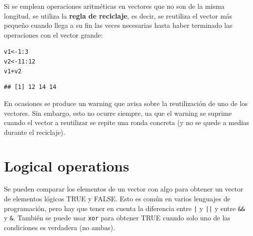 \documentclass{config/apuntes}\usepackage[]{graphicx}\usepackage[]{xcolor}
\makeatletter
\newcommand{\hlnum}[1]{\textcolor[rgb]{0.686,0.059,0.569}{#1}}%
\newcommand{\hlopt}[1]{\textcolor[rgb]{0,0,0}{#1}}%
\newcommand{\hldef}[1]{\textcolor[rgb]{0.345,0.345,0.345}{#1}}%
\newcommand{\hlkwb}[1]{\textcolor[rgb]{0.69,0.353,0.396}{#1}}%
\newenvironment{kframe}{%
 \def\at@end@of@kframe{}%
 \ifinner\ifhmode%
  \def\at@end@of@kframe{\end{minipage}}%
  \begin{minipage}{\columnwidth}%
 \fi\fi%
 \def\FrameCommand##1{\hskip\@totalleftmargin \hskip-\fboxsep
 \colorbox{shadecolor}{##1}\hskip-\fboxsep
     \hskip-\linewidth \hskip-\@totalleftmargin \hskip\columnwidth}%
 \MakeFramed {\advance\hsize-\width
   \@totalleftmargin\z@ \linewidth\hsize
   \@setminipage}}%
 {\par\unskip\endMakeFramed%
 \at@end@of@kframe}
\newenvironment{knitrout}{}{} %
\newcommand{\code}[1]{\texttt{#1}}
\makeatother
\begin{document}
Si se emplean operaciones aritméticas en vectores que no son de la misma longitud, se utiliza la \textbf{regla de reciclaje}, es decir, se reutiliza el vector más pequeño cuando llega a su fin las veces necesarias hasta haber terminado las operaciones con el vector grande:

\begin{knitrout}
\color{fgcolor}\begin{kframe}
\begin{alltt}
\hldef{v1} \hlkwb{<-} \hlnum{1}\hlopt{:}\hlnum{3}
\hldef{v2} \hlkwb{<-} \hlnum{11}\hlopt{:}\hlnum{12}
\hldef{v1} \hlopt{+} \hldef{v2}
\end{alltt}


{\ttfamily\noindent\color{warningcolor}{\#\# Warning in v1 + v2: longitud de objeto mayor no es múltiplo de la longitud de uno menor}}\begin{verbatim}
## [1] 12 14 14
\end{verbatim}
\end{kframe}
\end{knitrout}

En ocasiones se produce un warning que avisa sobre la reutilización de uno de los vectores. Sin embargo, esto no ocurre siempre, ua que el warning se suprime cuando el vector a reutilizar se repite una ronda concreta (y no se quede a medias durante el reciclaje).

\section{Logical operations}
Se pueden comparar los elementos de un vector con algo para obtener un vector de elementos lógicos TRUE y FALSE. Esto es común en varios lenguajes de programación, pero hay que tener en cuenta la diferencia entre \code{|} y \code{||} y entre \code{\&\&} y \code{\&}. También se puede usar \code{xor} para obtener TRUE cuando solo uno de las condiciones es verdadera (no ambas).
\end{document}
